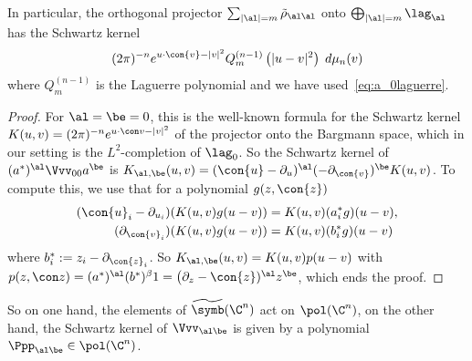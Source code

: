 In particular, the orthogonal projector $\sum_{|\al| = m } \tilde{\rho} _{\al
\al}$ onto $\bigoplus_{|\al| = m} \lag_{\al}$ has the Schwartz kernel
\begin{gather}\label{eq:noyau_niveau_m}
(2 \pi)^{-n} e^{u \cdot \con{v} - | v |^2 } Q_m ^{(n-1)} \left(| u - v |^2\right) \; d \mu_n (v)
\end{gather}
where $Q_m^{(n-1)}$ is the Laguerre polynomial and we have used~\eqref{eq:a_0laguerre}.
\begin{proof}
For $\al = \be =0$, this is the well-known formula for the Schwartz kernel $K (u,v) = (2\pi)^{-n} e^{u \cdot \con v - |v|^2} $ of the projector onto the Bargmann space, which in our setting is the $L^2$-completion of $\lag_0$. So the Schwartz kernel of $(a^{*})^{\al} \Vvv_{00} a^{\be}$ is $ K_{\al,\be} (u,v) = (\con{u} -\partial_u)^{\al} (-\partial_{\con{v}})^{\be} K(u,v)$. To compute this, we use that for a polynomial $g (z,\con{z})$
\begin{align*}
(\con{u}_i - \partial_{u_i}) (K(u,v) g(u-v)) & = K(u,v) (a_i^{*} g)(u-v), \\
(\partial_{\con{v}_i}) (K(u,v) g(u-v)) & = K(u,v) (b_i^{*} g)(u-v)
\end{align*}
where $b_i^{*} := z_i - \partial_{\con{z}_i}$. So $K_{\al,\be} (u,v) = K(u,v) p(u-v) $ with $p (z,\con z) = (a^{*})^{\al} (b^{*})^\beta 1= \bigl(
\partial_z - \con{z})^{\al} z^\be $, which ends the proof.
\end{proof}

So on one hand, the elements of $\widetilde{\symb} (\C^n)$ act on $\pol (\C^n)$, on the other hand, the Schwartz kernel of $\Vvv_{\al\be}$ is given by a polynomial $\Ppp_{\al\be} \in \pol (\C^n)$.

